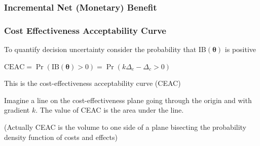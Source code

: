 \begin{frame}

\frametitle{Incremental Net (Monetary) Benefit}

\begin{center}
\end{center}

\end{frame}


\begin{frame}

\frametitle{Cost Effectiveness Acceptability Curve}

\bi
\item To quantify decision uncertainty consider the probability that IB$(\bm\theta)$ is positive

\item $\mbox{CEAC} = \Pr(\mbox{IB}(\bm\theta)>0)=\Pr(k\Delta_{e}-\Delta_{c}>0)$

\item This is the cost-effectiveness acceptability curve (CEAC)

\item Imagine a line on the cost-effectiveness plane going through the origin
and with gradient $k$. The value of CEAC is the area under the line.

\item (Actually CEAC is the volume to one side of a plane bisecting the
probability density function of costs and effects)
\ei

\end{frame}

